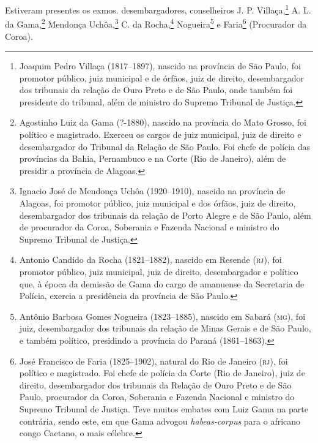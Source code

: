 {
Estiveram presentes os exmos. desembargadores, conselheiros J. P.
Villaça,\footnote{Joaquim Pedro Villaça (1817--1897), nascido na
  província de São Paulo, foi promotor público, juiz municipal e de
  órfãos, juiz de direito, desembargador dos tribunais da relação de
  Ouro Preto e de São Paulo, onde também foi presidente do tribunal,
  além de ministro do Supremo Tribunal de Justiça.} A. L. da 
Gama,\footnote{Agostinho Luiz da Gama (?-1880), nascido na província do
  Mato Grosso, foi político e magistrado. Exerceu os cargos de juiz
  municipal, juiz de direito e desembargador do Tribunal da Relação de
  São Paulo. Foi chefe de polícia das províncias da Bahia, Pernambuco e
  na Corte (Rio de Janeiro), além de presidir a província de Alagoas.}
Mendonça Uchôa,\footnote{Ignacio José de Mendonça Uchôa (1920--1910),
  nascido na província de Alagoas, foi promotor público, juiz municipal
  e dos órfãos, juiz de direito, desembargador dos tribunais da relação
  de Porto Alegre e de São Paulo, além de procurador da Coroa, Soberania
  e Fazenda Nacional e ministro do Supremo Tribunal de Justiça.} C. da
Rocha,\footnote{Antonio Candido da Rocha (1821--1882), nascido em
  Resende (\textsc{rj}), foi promotor público, juiz municipal, juiz de direito,
  desembargador e político que, à época da demissão de Gama do cargo de
  amanuense da Secretaria de Polícia, exercia a presidência da província
  de São Paulo.} Nogueira\footnote{Antônio Barbosa Gomes Nogueira
  (1823--1885), nascido em Sabará (\textsc{mg}), foi juiz, desembargador dos
  tribunais da relação de Minas Gerais e de São Paulo, e também
  político, presidindo a província do Paraná (1861--1863).} e
Faria\footnote{José Francisco de Faria (1825--1902), natural do Rio de \label{jff}
  Janeiro (\textsc{rj}), foi político e magistrado. Foi chefe de polícia da Corte
  (Rio de Janeiro), juiz de direito, desembargador dos tribunais da
  Relação de Ouro Preto e de São Paulo, procurador da Coroa, Soberania e
  Fazenda Nacional e ministro do Supremo Tribunal de Justiça. Teve
  muitos embates com Luiz Gama na parte contrária, sendo este, em que
  Gama advogou \emph{habeas-corpus} para o africano congo Caetano, o
  mais célebre.} (Procurador da Coroa).

}
